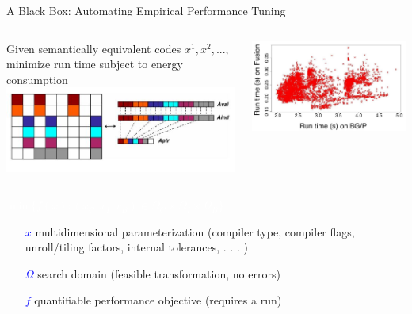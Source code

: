 \documentclass[handout,aspectratio=54]{beamer}
\numberwithin{theorem}{section}
\begin{document}
\begin{frame}{A Black Box: Automating Empirical Performance Tuning}
\begin{columns}
Given semantically equivalent codes $x^1,x^2,...$, minimize run time subject to energy consumption
\includegraphics[width=\textwidth]{fig/13-1.jpg}

\includegraphics[width=\textwidth]{fig/13-2.jpg}
\end{columns}

\colorbox[rgb]{0.5,0.6,0.7}{\textcolor{white}{$\min\{f(x):(x_C,x_I,x_B)\in\Omega_C\times\Omega_I\times\Omega_B\}$}}
\begin{itemize}
\item [\textcolor{blue}{$x$}] multidimensional parameterization (compiler type, compiler flags, unroll/tiling factors, internal tolerances, . . . )
\item [\textcolor{blue}{$\Omega$}] search domain (feasible transformation, no errors)
\item [\textcolor{blue}{$f$}] quantifiable performance objective (requires a run)
\end{itemize}

\end{frame}
\end{document}

